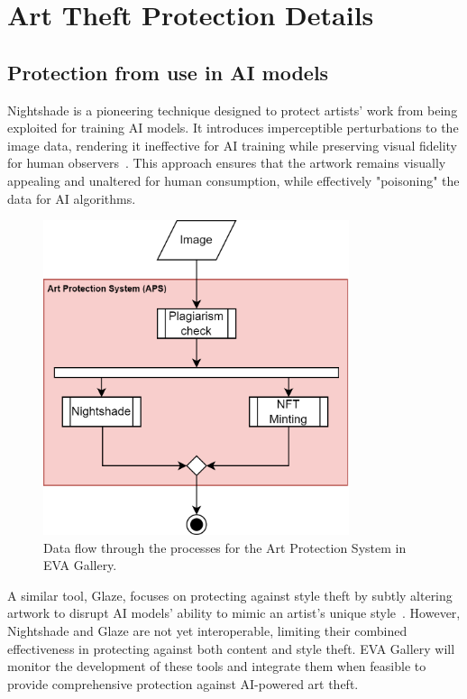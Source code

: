 \newpage

\section{Art Theft Protection Details}

\subsection{Protection from use in AI models}

Nightshade is a pioneering technique designed to protect artists' work from being exploited for training AI models. It introduces imperceptible perturbations to the image data, rendering it ineffective for AI training while preserving visual fidelity for human observers~\cite{shan2024nightshade}. This approach ensures that the artwork remains visually appealing and unaltered for human consumption, while effectively "poisoning" the data for AI algorithms.

\begin{figure}[ht]
    \centering
    \includegraphics[width=0.8\textwidth]{figs/aps.png}
    \caption{Data flow through the processes for the Art Protection System in EVA Gallery.}
    \label{fig:data_flow}
\end{figure}

A similar tool, Glaze, focuses on protecting against style theft by subtly altering artwork to disrupt AI models' ability to mimic an artist's unique style~\cite{shan2023glaze}. However, Nightshade and Glaze are not yet interoperable, limiting their combined effectiveness in protecting against both content and style theft. EVA Gallery will monitor the development of these tools and integrate them when feasible to provide comprehensive protection against AI-powered art theft.

